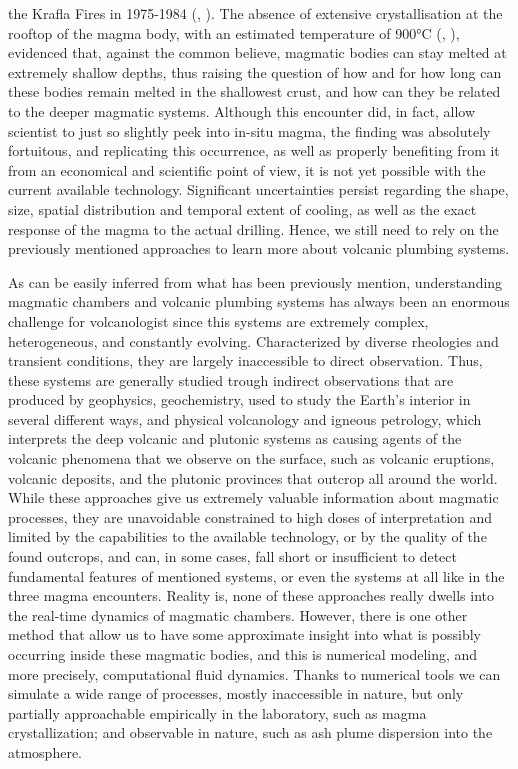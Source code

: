 the Krafla Fires in 1975-1984 (\cite{axelsson2014}, \cite{eichelberger2020}). The absence of extensive crystallisation at the rooftop of the magma body, with an estimated temperature of 900°C (\cite{elders2011}, \cite{zierenberg2013}), evidenced that, against the common believe, magmatic bodies can stay melted at extremely shallow depths, thus raising the question of how and for how long can these bodies remain melted in the shallowest crust, and how can they be related to the deeper magmatic systems. Although this encounter did, in fact, allow scientist to just so slightly peek into in-situ magma, the finding was absolutely fortuitous, and replicating this occurrence, as well as properly benefiting from it from an economical and scientific point of view, it is not yet possible with the current available technology. Significant uncertainties persist regarding the shape, size, spatial distribution and temporal extent of cooling, as well as the exact response of the magma to the actual drilling. Hence, we still need to rely on the previously mentioned approaches to learn more about volcanic plumbing systems.

As can be easily inferred from what has been previously mention, understanding magmatic chambers and volcanic plumbing systems has always been an enormous challenge for volcanologist since this systems are extremely complex, heterogeneous, and constantly evolving. Characterized by diverse rheologies and transient conditions, they are largely inaccessible to direct observation. Thus, these systems are generally studied trough indirect observations that are produced by geophysics, geochemistry, used to study the Earth's interior in several different ways, and physical volcanology and igneous petrology, which interprets the deep volcanic and plutonic systems as causing agents of the volcanic phenomena that we observe on the surface, such as volcanic eruptions, volcanic deposits, and the plutonic provinces that outcrop all around the world. While these approaches give us extremely valuable information about magmatic processes, they are unavoidable constrained to high doses of interpretation and limited by the capabilities to the available technology, or by the quality of the found outcrops, and can, in some cases, fall short or insufficient to detect fundamental features of mentioned systems, or even the systems at all like in the three magma encounters. Reality is, none of these approaches really dwells into the real-time dynamics of magmatic chambers. However, there is one other method that allow us to have some approximate insight into what is possibly occurring inside these magmatic bodies, and this is numerical modeling, and more precisely, computational fluid dynamics. Thanks to numerical tools we can simulate a wide range of processes, mostly inaccessible in nature, but only partially approachable empirically in the laboratory, such as magma crystallization; and observable in nature, such as ash plume dispersion into the atmosphere.

